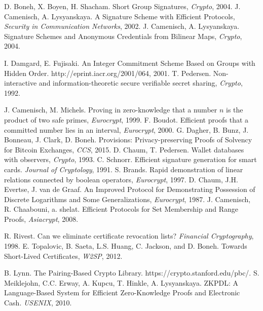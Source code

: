\documentclass[letterpaper,twocolumn,10pt]{article}
\begin{document}
\begin{thebibliography}{9}
 D. Boneh, X. Boyen, H. Shacham. Short Group Signatures, \emph{Crypto}, 2004.
 J. Camenisch, A. Lysyanskaya. A Signature Scheme with Efficient Protocols, \emph{Security in Communication Networks}, 2002.
 J. Camenisch, A. Lysyanskaya. Signature Schemes and Anonymous Credentials from Bilinear Maps, \emph{Crypto}, 2004.

 I. Damgard, E. Fujisaki. An Integer Commitment Scheme Based on Groups with Hidden Order. http://eprint.iacr.org/2001/064, 2001.
 T. Pedersen. Non-interactive and information-theoretic secure verifiable secret sharing, \emph{Crypto}, 1992.

 J. Camenisch, M. Michels. Proving in zero-knowledge that a number $n$ is the product of two safe primes, \emph{Eurocrypt}, 1999.
 F. Boudot. Efficient proofs that a committed number lies in an interval, \emph{Eurocrypt}, 2000.
 G. Dagher, B. Bunz, J. Bonneau, J. Clark, D. Boneh. Provisions: Privacy-preserving Proofs of Solvency for Bitcoin Exchanges, \emph{CCS}, 2015.
 D. Chaum, T. Pedersen. Wallet databases with observers, \emph{Crypto}, 1993.
 C. Schnorr. Efficient signature generation for smart cards. \emph{Journal of Cryptology}, 1991.
 S. Brands. Rapid demonstration of linear relations connected by boolean operators, \emph{Eurocrypt}, 1997.
 D. Chaum, J.H. Evertse, J. van de Graaf. An Improved Protocol for Demonstrating Possession of Discrete Logarithms and Some Generalizations, \emph{Eurocrypt}, 1987.
 J. Camenisch, R. Chaabouni, a. shelat. Efficient Protocols for Set Membership and
Range Proofs, \emph{Asiacrypt}, 2008. 

 R. Rivest. Can we eliminate certificate revocation lists? \emph{Financial Cryptography}, 1998.
 E. Topalovic, B. Saeta, L.S. Huang, C. Jackson, and D. Boneh. Towards Short-Lived Certificates, \emph{W2SP}, 2012.


 B. Lynn. The Pairing-Based Crypto Library. https://crypto.stanford.edu/pbc/.
 S. Meiklejohn, C.C. Erway, A. Kupcu, T. Hinkle, A. Lysyanskaya. ZKPDL: A Language-Based System for Efficient Zero-Knowledge Proofs and Electronic Cash. \emph{USENIX}, 2010.

\end{thebibliography}
\end{document}
